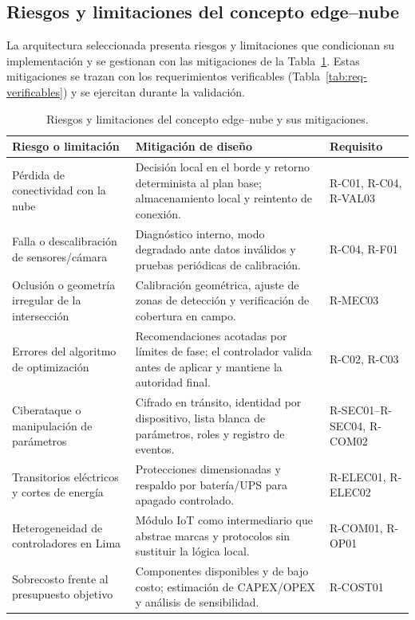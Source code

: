 \subsection{Riesgos y limitaciones del concepto edge--nube}\label{sec:riesgos-concepto}

La arquitectura seleccionada presenta riesgos y limitaciones que condicionan su implementación y se gestionan
con las mitigaciones de la Tabla~\ref{tab:riesgos-concepto}. Estas mitigaciones se trazan con los
requerimientos verificables (Tabla~\ref{tab:req-verificables}) y se ejercitan durante la validación.

\begin{table}[H]
  \centering
  \caption{Riesgos y limitaciones del concepto edge--nube y sus mitigaciones.}
  \label{tab:riesgos-concepto}
  \begin{tabularx}{\linewidth}{@{}>{\raggedright\arraybackslash}p{3.6cm}>{\raggedright\arraybackslash}X>{\raggedright\arraybackslash}p{2.0cm}@{}}
    \toprule
    \textbf{Riesgo o limitación} & \textbf{Mitigación de diseño} & \textbf{Requisito}\\
    \midrule
    Pérdida de conectividad con la nube & Decisión local en el borde y retorno determinista al plan base; almacenamiento local y reintento de conexión. & R-C01, R-C04, R-VAL03\\
    Falla o descalibración de sensores/cámara & Diagnóstico interno, modo degradado ante datos inválidos y pruebas periódicas de calibración. & R-C04, R-F01\\
    Oclusión o geometría irregular de la intersección & Calibración geométrica, ajuste de zonas de detección y verificación de cobertura en campo. & R-MEC03\\
    Errores del algoritmo de optimización & Recomendaciones acotadas por límites de fase; el controlador valida antes de aplicar y mantiene la autoridad final. & R-C02, R-C03\\
    Ciberataque o manipulación de parámetros & Cifrado en tránsito, identidad por dispositivo, lista blanca de parámetros, roles y registro de eventos. & R-SEC01--R-SEC04, R-COM02\\
    Transitorios eléctricos y cortes de energía & Protecciones dimensionadas y respaldo por batería/UPS para apagado controlado. & R-ELEC01, R-ELEC02\\
    Heterogeneidad de controladores en Lima & Módulo IoT como intermediario que abstrae marcas y protocolos sin sustituir la lógica local. & R-COM01, R-OP01\\
    Sobrecosto frente al presupuesto objetivo & Componentes disponibles y de bajo costo; estimación de CAPEX/OPEX y análisis de sensibilidad. & R-COST01\\
    \bottomrule
  \end{tabularx}
\end{table}

